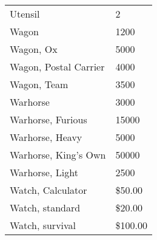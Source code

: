 \documentclass[twoside]{book}
\begin{document}
\begin{longtable}{p{1.25in}l}
      \raggedright Utensil & 2 \tabularnewline
      \raggedright Wagon & 1200 \tabularnewline
      \raggedright Wagon, Ox & 5000 \tabularnewline
      \raggedright Wagon, Postal Carrier & 4000 \tabularnewline
      \raggedright Wagon, Team & 3500 \tabularnewline
      \raggedright Warhorse & 3000 \tabularnewline
      \raggedright Warhorse, Furious & 15000 \tabularnewline
      \raggedright Warhorse, Heavy & 5000 \tabularnewline
      \raggedright Warhorse, King's Own
           & 50000 \tabularnewline
      \raggedright Warhorse, Light & 2500 \tabularnewline
      \raggedright Watch, Calculator & \$50.00 \tabularnewline
      \raggedright Watch, standard & \$20.00 \tabularnewline
      \raggedright Watch, survival & \$100.00 \tabularnewline
      
\end{longtable}
    
\end{document}
